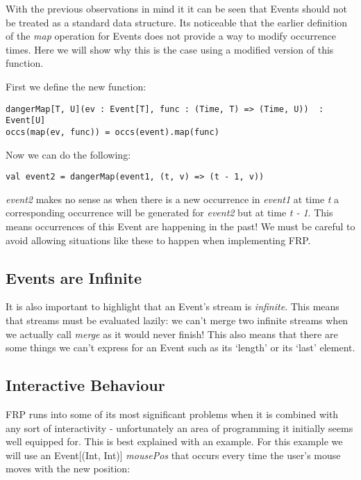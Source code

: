       With the previous observations in mind it it can be seen that Events should not be treated as a
      standard data structure. Its noticeable that the earlier definition of the \emph{map} operation for
      Events does not provide a way to modify occurrence times. Here we will show why this is
      the case using a modified version of this function.
      
      First we define the new function:
      
\begin{verbatim}
dangerMap[T, U](ev : Event[T], func : (Time, T) => (Time, U))  : Event[U]
occs(map(ev, func)) = occs(event).map(func)
\end{verbatim}

      Now we can do the following:
      
\begin{verbatim}
val event2 = dangerMap(event1, (t, v) => (t - 1, v))
\end{verbatim}

      \emph{event2} makes no sense as when there is a new occurrence in \emph{event1} at time 
      \emph{t} a corresponding occurrence will be generated for \emph{event2} but at time 
      \emph{t - 1}. This means occurrences of this Event are happening in the past! We must
      be careful to avoid allowing situations like these to happen when implementing FRP.
      
    \subsection{Events are Infinite}  
      It is also important to highlight that an Event's stream is \emph{infinite}. This means
      that streams must be evaluated lazily: we can't merge two infinite streams when we actually
      call \emph{merge} as it would never finish! This also means that there are some things we
      can't express for an Event such as its `length' or its `last' element.
    
      
    \subsection{Interactive Behaviour}
      FRP runs into some of its most significant problems when it is combined with any
      sort of interactivity - unfortunately an area of programming it initially seems
      well equipped for. This is best explained with an example. For this example we will use an 
      Event[(Int, Int)] \emph{mousePos} that occurs every time the user's mouse moves with the new position:

